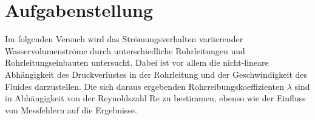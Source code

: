 \chapter{Aufgabenstellung}
\label{sec:aufgabenstellung}

Im folgenden Versuch wird das Strömungsverhalten variierender Wasservolumenströme durch unterschiedliche Rohrleitungen und Rohrleitungseinbauten untersucht. Dabei ist vor allem die nicht-lineare Abhängigkeit des Druckverlustes in der Rohrleitung und der Geschwindigkeit des Fluides darzustellen. Die sich daraus ergebenden Rohrreibungskoeffizienten $\lambda$ sind in Abhängigkeit von der Reynoldszahl Re zu bestimmen, ebenso wie der Einfluss von Messfehlern auf die Ergebnisse. 